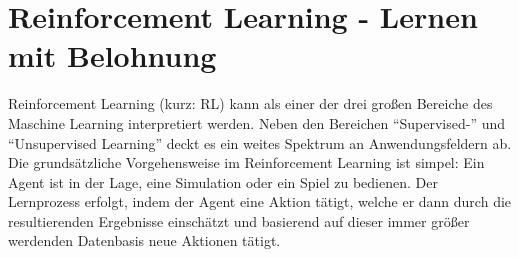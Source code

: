 %
\chapter{Reinforcement Learning - Lernen mit Belohnung}
\label{chap:rl}
%

	Reinforcement Learning (kurz: RL) kann als einer der drei großen Bereiche des Maschine Learning interpretiert werden. Neben den Bereichen ``Supervised-'' und ``Unsupervised Learning'' deckt es ein weites Spektrum an Anwendungsfeldern ab.\\
	Die grundsätzliche Vorgehensweise im Reinforcement Learning ist simpel: Ein Agent ist in der Lage, eine Simulation oder ein Spiel zu bedienen. Der Lernprozess erfolgt, indem der Agent eine Aktion tätigt, welche er dann durch die resultierenden Ergebnisse einschätzt und basierend auf dieser immer größer werdenden Datenbasis neue Aktionen tätigt.
	

